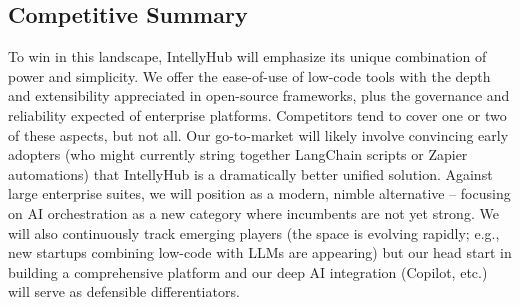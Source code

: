 \documentclass[11pt, a4paper, oneside]{article}
\begin{document}
\subsection{Competitive Summary}
To win in this landscape, IntellyHub will emphasize its unique combination of power and simplicity. We offer the ease-of-use of low-code tools with the depth and extensibility appreciated in open-source frameworks, plus the governance and reliability expected of enterprise platforms. Competitors tend to cover one or two of these aspects, but not all. Our go-to-market will likely involve convincing early adopters (who might currently string together LangChain scripts or Zapier automations) that IntellyHub is a dramatically better unified solution. Against large enterprise suites, we will position as a modern, nimble alternative – focusing on AI orchestration as a new category where incumbents are not yet strong. We will also continuously track emerging players (the space is evolving rapidly; e.g., new startups combining low-code with LLMs are appearing) but our head start in building a comprehensive platform and our deep AI integration (Copilot, etc.) will serve as defensible differentiators.
\end{document}
